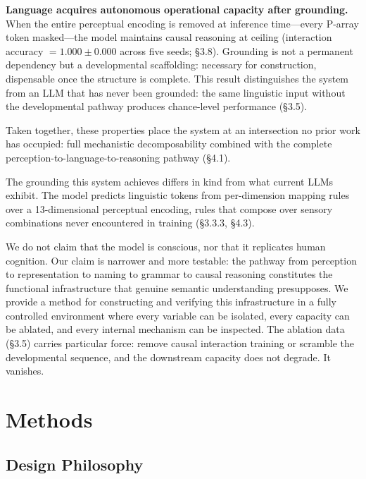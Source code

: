 \documentclass{article}
\begin{document}
\textbf{Language acquires autonomous operational capacity after grounding.} When the entire perceptual encoding is removed at inference time---every P-array token masked---the model maintains causal reasoning at ceiling (interaction accuracy $= 1.000 \pm 0.000$ across five seeds; \S3.8). Grounding is not a permanent dependency but a developmental scaffolding: necessary for construction, dispensable once the structure is complete. This result distinguishes the system from an LLM that has never been grounded: the same linguistic input without the developmental pathway produces chance-level performance (\S3.5).

Taken together, these properties place the system at an intersection no prior work has occupied: full mechanistic decomposability combined with the complete perception-to-language-to-reasoning pathway (\S4.1).

The grounding this system achieves differs in kind from what current LLMs exhibit. The model predicts linguistic tokens from per-dimension mapping rules over a 13-dimensional perceptual encoding, rules that compose over sensory combinations never encountered in training (\S3.3.3, \S4.3).

We do not claim that the model is conscious, nor that it replicates human cognition. Our claim is narrower and more testable: the pathway from perception to representation to naming to grammar to causal reasoning constitutes the functional infrastructure that genuine semantic understanding presupposes. We provide a method for constructing and verifying this infrastructure in a fully controlled environment where every variable can be isolated, every capacity can be ablated, and every internal mechanism can be inspected. The ablation data (\S3.5) carries particular force: remove causal interaction training or scramble the developmental sequence, and the downstream capacity does not degrade. It vanishes.

\section{Methods}

\subsection{Design Philosophy}
\end{document}
